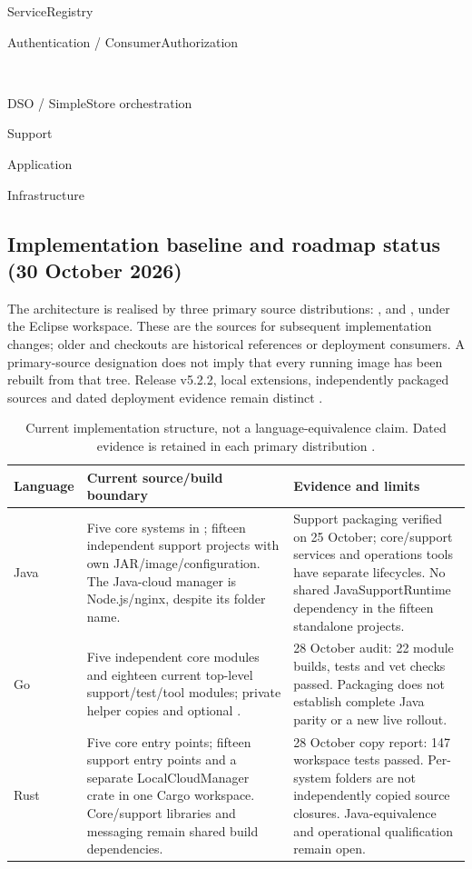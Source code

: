 \documentclass[a4paper]{arrowhead}
\begin{document}
\begin{center}\scriptsize
\setlength{\fboxsep}{4pt}
\colorbox{AHSysMLRegistry}{\strut ServiceRegistry}\quad
\colorbox{AHSysMLSecurity}{\strut Authentication / ConsumerAuthorization}\\[6pt]
\colorbox{AHSysMLOrchestration}{\strut DSO / SimpleStore orchestration}\quad
\colorbox{AHSysMLSupport}{\strut Support}\quad
\colorbox{AHSysMLApplication}{\strut Application}\quad
\colorbox{AHSysMLInfrastructure}{\strut Infrastructure}
\end{center}

\subsection{Implementation baseline and roadmap status (30 October 2026)}
\label{sec:baseline-20261030}
The architecture is realised by three primary source distributions:
,  and
, under the Eclipse workspace. These are the
sources for subsequent implementation changes; older  and
 checkouts are historical references or deployment consumers.
A primary-source designation does not imply that every running image has been
rebuilt from that tree. Release v5.2.2, local extensions, independently packaged
sources and dated deployment evidence remain distinct \cite{primaryBaseline20261030}.

\begin{table}[htbp]
\centering\small
\begin{tabularx}{\textwidth}{|P{1.6cm}|X|X|}\hline
{} Language & Current source/build boundary & Evidence and limits \\\hline
Java & Five core systems in ; fifteen independent
support projects with own JAR/image/configuration. The Java-cloud manager is
Node.js/nginx, despite its folder name. & Support packaging verified on
25 October; core/support services and operations tools have separate lifecycles.
No shared JavaSupportRuntime dependency in the fifteen standalone projects. \\\hline
Go & Five independent core modules and eighteen current top-level support/test/tool
modules; private helper copies and optional . & 28 October audit:
22 module builds, tests and vet checks passed. Packaging does not establish
complete Java parity or a new live rollout. \\\hline
Rust & Five core entry points; fifteen support entry points and a separate
LocalCloudManager crate in one Cargo workspace. Core/support libraries and
messaging remain shared build dependencies. & 28 October copy report:
147 workspace tests passed. Per-system folders are not independently copied
source closures. Java-equivalence and operational qualification remain open. \\\hline
\end{tabularx}
\caption{Current implementation structure, not a language-equivalence claim.
Dated evidence is retained in each primary distribution
\cite{javaPackaging20261025,goPackaging20261028,rustPackaging20261028}.}
\end{table}
\FloatBarrier
\end{document}
